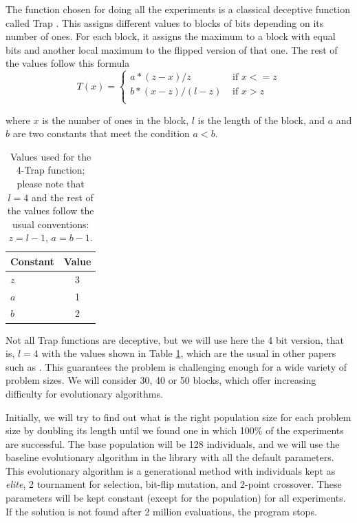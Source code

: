 \documentclass{sig-alternate}
\begin{document}
The function chosen for doing all the experiments is a classical deceptive
function called Trap \cite{ackley:trap}. This assigns different values
to blocks of bits depending on its number of ones. For each block, it
assigns the maximum to a block with equal bits and another local
maximum to the flipped version of that one. The rest of the values
follow this formula
$$
  T(x) = \left\{ \begin{array}{rl} 
      a*(z-x)/z &\mbox{ if  $x<= z$} \\
    b*(x-z)/(l-z) &\mbox{ if  $x>z$} \\
\end{array}\right.
$$

where $x$ is the number of ones in the block, $l$ is the length of the
block, and $a$ and $b$ are two constants that meet the condition $a <
b$.

\begin{table}[h]
    \centering
    \begin{tabular}{|l|c|}
\hline
Constant & Value \\
\hline
$z$ & 3 \\
$a$ & 1 \\
$b$ & 2 \\
\hline
\end{tabular}
\caption{Values used for the 4-Trap function; please note that $l=4$
  and the rest of the values follow the usual conventions: $z=l-1$,
  $a=b-1$.\label{tab:trap}}
\end{table}

Not all Trap functions are
deceptive, but we will use here the 4 bit version, that is, $l=4$ with
the values shown in Table \ref{tab:trap}, which are the usual in other
papers such as \cite{gonzalez2010characterizing}. This guarantees the
problem is challenging enough for a wide variety of problem sizes. We
will consider 30, 40 or 50 blocks, which offer increasing difficulty
for evolutionary algorithms.

Initially, we will try to find out what is the right population size
for each problem size by doubling its length until we found one in which
100\% of the experiments are successful. The base population will be
128 individuals, and we will use the baseline evolutionary algorithm
in the library with all the default parameters. This evolutionary
algorithm is a generational method with individuals kept as {\em
  elite}, 2 tournament for selection, bit-flip mutation, and
2-point crossover. These parameters will be kept constant (except for
the population) for all experiments.  If
the solution is not found after 2 million evaluations, the program
stops. 
\end{document}
